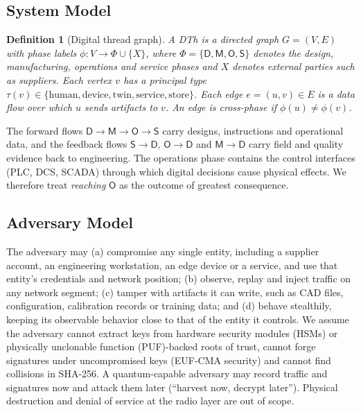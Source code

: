 \documentclass[journal]{IEEEtran}
\newtheorem{definition}{Definition}
\begin{document}
\subsection{System Model}
\begin{definition}[Digital thread graph]
A DTh is a directed graph $G=(V,E)$ with phase labels $\phi:V\to\Phi\cup\{X\}$, where $\Phi=\{\mathsf{D},\mathsf{M},\mathsf{O},\mathsf{S}\}$ denotes the design, manufacturing, operations and service phases and $X$ denotes external parties such as suppliers. Each vertex $v$ has a principal type $\tau(v)\in\{\text{human},\text{device},\text{twin},\text{service},\text{store}\}$. Each edge $e=(u,v)\in E$ is a data flow over which $u$ sends artifacts to $v$. An edge is \emph{cross-phase} if $\phi(u)\neq\phi(v)$.
\end{definition}
The forward flows $\mathsf{D}\!\to\!\mathsf{M}\!\to\!\mathsf{O}\!\to\!\mathsf{S}$ carry designs, instructions and operational data, and the feedback flows $\mathsf{S}\!\to\!\mathsf{D}$, $\mathsf{O}\!\to\!\mathsf{D}$ and $\mathsf{M}\!\to\!\mathsf{D}$ carry field and quality evidence back to engineering. The operations phase contains the control interfaces (PLC, DCS, SCADA) through which digital decisions cause physical effects. We therefore treat \emph{reaching} $\mathsf{O}$ as the outcome of greatest consequence.

\subsection{Adversary Model}
The adversary may (a) compromise any single entity, including a supplier account, an engineering workstation, an edge device or a service, and use that entity's credentials and network position; (b) observe, replay and inject traffic on any network segment; (c) tamper with artifacts it can write, such as CAD files, configuration, calibration records or training data; and (d) behave stealthily, keeping its observable behavior close to that of the entity it controls. We assume the adversary cannot extract keys from hardware security modules (HSMs) or physically unclonable function (PUF)-backed roots of trust, cannot forge signatures under uncompromised keys (EUF-CMA security) and cannot find collisions in SHA-256. A quantum-capable adversary may record traffic and signatures now and attack them later (``harvest now, decrypt later''). Physical destruction and denial of service at the radio layer are out of scope.
\end{document}
